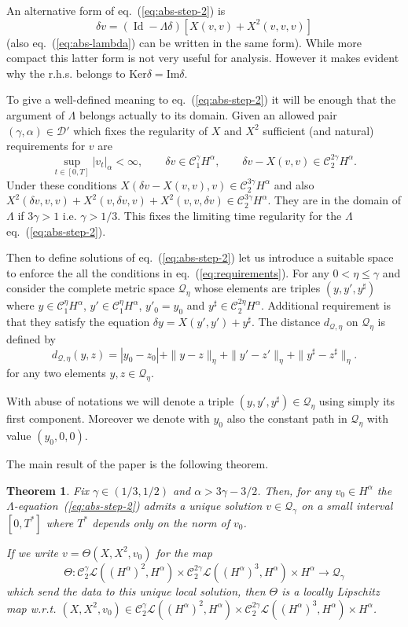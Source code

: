 \documentclass[a4paper,12pt,reqno]{article}
\newcommand{\der}{\delta}
\newcommand{\CC}{\mathcal{C}}
\newcommand{\DD}{\mathcal{D}}
\newcommand{\QQ}{\mathcal{Q}}
\newcommand{\LL}{\mathcal{L}}
\DeclareMathOperator{\id}{\text{Id}}
\newtheorem{theorem}{Theorem}
\begin{document}
An alternative form of eq.~(\ref{eq:abs-step-2}) is
\begin{equation}
  \label{eq:abs-step-2-compact}
\der v = (\id - \Lambda \der)[X(v,v)+X^2(v,v,v)]
\end{equation}
(also eq.~(\ref{eq:abs-lambda}) can be written in the same
form). While more compact this latter form is not very useful for
analysis. However it makes evident why the r.h.s. belongs to $\text{Ker} \der = \text{Im} \der$.

To give a well-defined meaning to eq.~(\ref{eq:abs-step-2}) it will be enough that the argument of $\Lambda$ belongs actually to its domain. Given an allowed pair $(\gamma,\alpha) \in \DD'$ which fixes the regularity of $X$ and $X^2$ sufficient (and natural) requirements for $v$ are
\begin{equation}
  \label{eq:requirements}
\sup_{t\in[0,T]}|v_t|_\alpha <\infty,\qquad  \der v \in \CC^\gamma_1 H^\alpha,\qquad \der v - X(v,v) \in \CC^{2\gamma}_2 H^\alpha.   
\end{equation}
Under these conditions $X(\der v- X(v,v),v) \in \CC^{3\gamma}_2 H^\alpha$ and also $X^2(\der v,v,v) +
X^2(v,\der v,v) + X^2( v,v,\der v) \in \CC^{3\gamma}_2 H^\alpha$. They are in the domain of $\Lambda$ if $3\gamma > 1$ i.e. $\gamma > 1/3$. This fixes the limiting time regularity for the $\Lambda$ eq.~(\ref{eq:abs-step-2}).

Then to define solutions of eq.~(\ref{eq:abs-step-2}) let us introduce a suitable  space to enforce the all the conditions in eq.~(\ref{eq:requirements}).
For any $0 < \eta \le \gamma$ and consider the complete metric space $\QQ_\eta$ whose elements are triples $(y,y',y^\sharp)$
where $y \in \CC_1^\eta H^\alpha$, $y' \in \CC_1^\eta H^\alpha$, $y'_0 = y_0$ and $y^\sharp \in \CC_2^{2\eta}
H^\alpha$. Additional requirement is that they satisfy the equation $\der y = X(y',y') +
y^\sharp$.  The distance $d_{\QQ,\eta}$ on $\QQ_\eta$ is defined by
$$
d_{\QQ,\eta}(y,z) = |y_0-z_0| + \|y-z\|_{\eta} + \|y'-z'\|_{\eta} + \|y^\sharp-z^{\sharp}\|_{\eta}. 
$$
for any two elements $y,z \in \QQ_\eta$. 

With abuse of notations we will denote a triple
$(y,y',y^\sharp) \in \QQ_\eta$ using simply its first component.
Moreover  we denote with $y_0$ also the constant path in $\QQ_\eta$ with value $(y_0,0,0)$. 

The main result of the paper is the following theorem.

\begin{theorem}
\label{thm:main}
Fix $\gamma \in (1/3,1/2)$ and $\alpha > 3\gamma -3/2$. Then, for any
$v_0 \in H^\alpha$ 
the $\Lambda$-equation~(\ref{eq:abs-step-2}) admits a unique solution
$v \in \QQ_\gamma$ on a small
interval $[0,T^*]$ where $T^*$ depends only on the norm of $v_0$.

If we write $v = \Theta(X,X^2,v_0)$ for the map 
$$
\Theta: \CC^\gamma_2 \LL((H^\alpha)^2,H^\alpha) \times \CC^{2\gamma}_2 \LL((H^\alpha)^3,H^\alpha) \times H^\alpha \to \QQ_\gamma
$$ which send the data to this unique local solution, then $\Theta$ is a locally Lipschitz map w.r.t. $(X,X^2,v_0) \in \CC^\gamma_2 \LL((H^\alpha)^2,H^\alpha) \times \CC^{2\gamma}_2 \LL((H^\alpha)^3,H^\alpha) \times H^\alpha$. 
\end{theorem}
\end{document}

